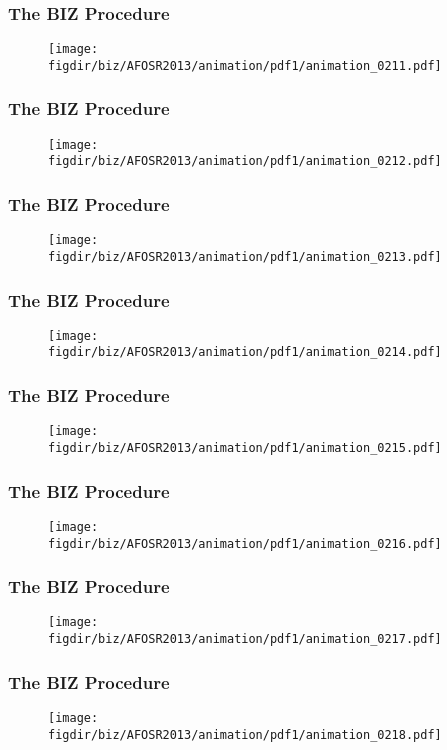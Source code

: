 \documentclass[13pt]{beamer}
\newcommand{\figdir}{../../fig}
\begin{document}
{\begin{frame}\frametitle{The BIZ Procedure}\begin{figure}\texttt{[image: \\figdir/biz/AFOSR2013/animation/pdf1/animation\_0211.pdf]}\end{figure}\end{frame}
\begin{frame}\frametitle{The BIZ Procedure}\begin{figure}\texttt{[image: \\figdir/biz/AFOSR2013/animation/pdf1/animation\_0212.pdf]}\end{figure}\end{frame}
\begin{frame}\frametitle{The BIZ Procedure}\begin{figure}\texttt{[image: \\figdir/biz/AFOSR2013/animation/pdf1/animation\_0213.pdf]}\end{figure}\end{frame}
\begin{frame}\frametitle{The BIZ Procedure}\begin{figure}\texttt{[image: \\figdir/biz/AFOSR2013/animation/pdf1/animation\_0214.pdf]}\end{figure}\end{frame}
\begin{frame}\frametitle{The BIZ Procedure}\begin{figure}\texttt{[image: \\figdir/biz/AFOSR2013/animation/pdf1/animation\_0215.pdf]}\end{figure}\end{frame}
\begin{frame}\frametitle{The BIZ Procedure}\begin{figure}\texttt{[image: \\figdir/biz/AFOSR2013/animation/pdf1/animation\_0216.pdf]}\end{figure}\end{frame}
\begin{frame}\frametitle{The BIZ Procedure}\begin{figure}\texttt{[image: \\figdir/biz/AFOSR2013/animation/pdf1/animation\_0217.pdf]}\end{figure}\end{frame}
\begin{frame}\frametitle{The BIZ Procedure}\begin{figure}\texttt{[image: \\figdir/biz/AFOSR2013/animation/pdf1/animation\_0218.pdf]}\end{figure}\end{frame}
}
\end{document}
